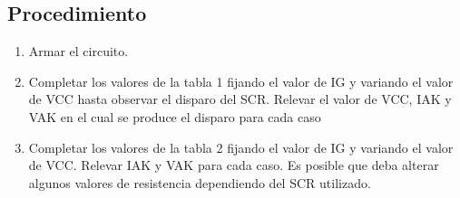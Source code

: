 \subsection{Procedimiento}
\begin{enumerate}
  \item Armar el circuito.
  \item Completar los valores de la tabla 1 fijando el valor de IG y variando el valor
    de VCC hasta observar el disparo del SCR. Relevar el valor de VCC, IAK y VAK
    en el cual se produce el disparo para cada caso 
  \item Completar los valores de la tabla 2 fijando el valor de IG y variando el valor
    de VCC. Relevar IAK y VAK para cada caso. Es posible que deba alterar
    algunos valores de resistencia dependiendo del SCR utilizado.
\end{enumerate}
